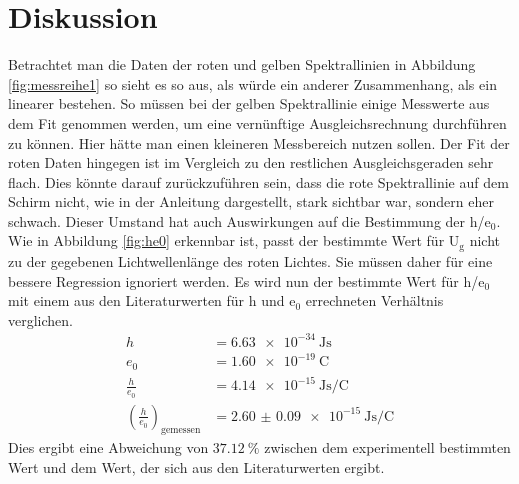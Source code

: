 \section{Diskussion}
\label{sec:Diskussion}

Betrachtet man die Daten der roten und gelben Spektrallinien in Abbildung \ref{fig:messreihe1} so sieht es so aus, als würde ein anderer Zusammenhang, als ein linearer bestehen.
So müssen bei der gelben Spektrallinie einige Messwerte aus dem Fit genommen werden, um eine vernünftige Ausgleichsrechnung durchführen zu können.
Hier hätte man einen kleineren Messbereich nutzen sollen.
Der Fit der roten Daten hingegen ist im Vergleich zu den restlichen Ausgleichsgeraden sehr flach.
Dies könnte darauf zurückzuführen sein, dass die rote Spektrallinie auf dem Schirm nicht, wie in der Anleitung dargestellt, stark sichtbar war, sondern eher schwach.
Dieser Umstand hat auch Auswirkungen auf die Bestimmung der h/e$_0$.
Wie in Abbildung \ref{fig:he0} erkennbar ist, passt der bestimmte Wert für U$_\text{g}$ nicht zu der gegebenen Lichtwellenlänge des roten Lichtes.
Sie müssen daher für eine bessere Regression ignoriert werden.
Es wird nun der bestimmte Wert für h/e$_0$ mit einem aus den Literaturwerten für h\cite{Planck} und e$_0$\cite{Ladung} errechneten Verhältnis verglichen.
\begin{align*}
  h &= \SI{6.63e-34}{\joule\second} \\
  e_0 &= \SI{1.60e-19}{\coulomb} \\
  \frac{h}{e_0} &= \SI{4.14e-15}{\joule\second\per\coulomb} \\
  {(\frac{h}{e_0})}_\text{gemessen} &= \SI{2.60(9)e-15}{\joule\second\per\coulomb}
\end{align*}
Dies ergibt eine Abweichung von $\SI{37.12}{\percent}$ zwischen dem experimentell bestimmten Wert und dem Wert, der sich aus den Literaturwerten ergibt.
